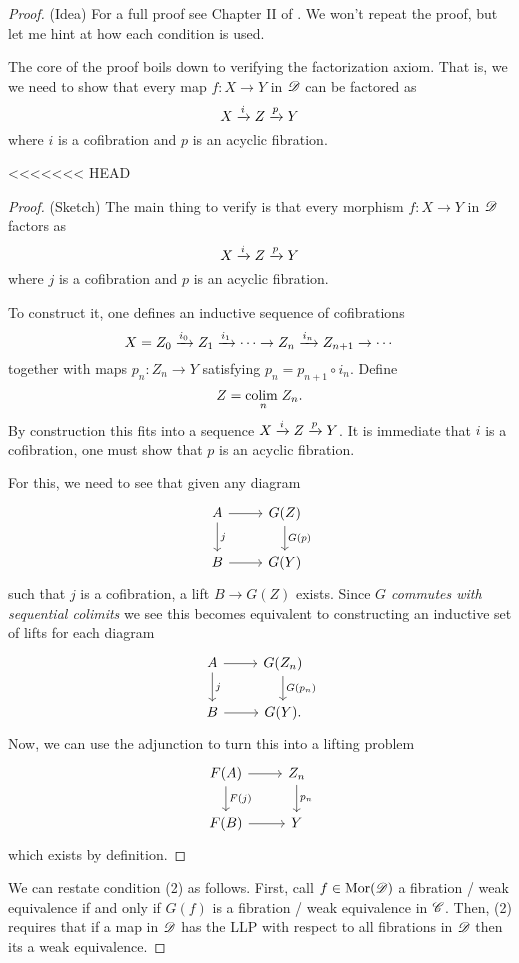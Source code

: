 \documentclass[11pt]{amsart}
\def\colim{{\rm colim}\;}
\begin{document}
\begin{proof}(Idea)
For a full proof see Chapter II of \cite{GJ}.
We won't repeat the proof, but let me hint at how each condition is used. 

The core of the proof boils down to verifying the factorization axiom. 
That is, we we need to show that every map $f : X \to Y$ in $\mathscr D$ can be factored as
\[
X \xrightarrow{i} Z \xrightarrow{p} Y
\]
where $i$ is a cofibration and $p$ is an acyclic fibration.

<<<<<<< HEAD
\begin{proof} (Sketch)
The main thing to verify is that every morphism $f : X \to Y$ in $\mathscr D$ factors as
\[
X \xrightarrow{i} Z \xrightarrow{p} Y
\]
where $j$ is a cofibration and $p$ is an acyclic fibration. 

To construct it, one defines an inductive sequence of cofibrations
\[
X = Z_0 \xrightarrow{i_0} Z_1 \xrightarrow{i_1} \cdots \to Z_n \xrightarrow{i_n} Z_{n+1} \to \cdots
\]
together with maps $p_n : Z_n \to Y$ satisfying $p_n = p_{n+1} \circ i_n$. 
Define 
\[
Z = \underset{n}{\colim} Z_n .
\]
By construction this fits into a sequence $X \xrightarrow{i} Z \xrightarrow{p} Y$. 
It is immediate that $i$ is a cofibration, one must show that $p$ is an acyclic fibration. 

For this, we need to see that given any diagram
\[
\begin{tikzcd}
A \ar[r] \ar[d,"j"] & G(Z) \ar[d, "G(p)"] \\
B \ar[r] & G(Y) 
\end{tikzcd}
\]
such that $j$ is a cofibration, a lift $B \to G(Z)$ exists. 
Since {\em $G$ commutes with sequential colimits} we see this becomes equivalent to constructing an inductive set of lifts for each diagram
\[
\begin{tikzcd}
A \ar[r] \ar[d,"j"] & G(Z_n) \ar[d, "G(p_n)"] \\
B \ar[r] & G(Y) .
\end{tikzcd}
\]
Now, we can use the adjunction to turn this into a lifting problem
\[
\begin{tikzcd}
F(A) \ar[r] \ar[d,"F(j)"] & Z_n \ar[d, "p_n"] \\
F(B) \ar[r] & Y 
\end{tikzcd}
\]
which exists by definition. 
\end{proof}


We can restate condition (2) as follows. 
First, call $f \in {\rm Mor}(\mathscr D)$ a fibration / weak equivalence if and only if $G(f)$ is a fibration / weak equivalence in $\mathscr C$. 
Then, (2) requires that if a map in $\mathscr D$ has the LLP with respect to all fibrations in $\mathscr D$ then its a weak equivalence. 


\end{proof}
\end{document}
